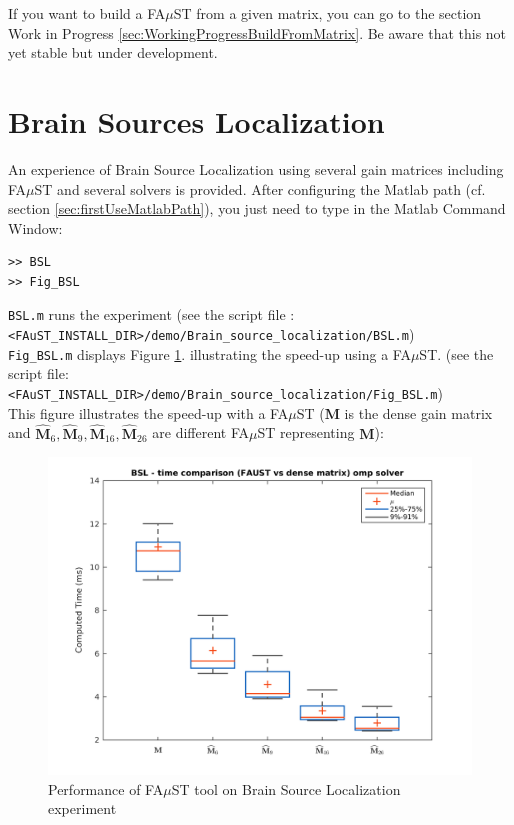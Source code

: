 If you want to build a FA$\mu$ST from a given matrix, you can go to the section Work in Progress \ref{sec:WorkingProgressBuildFromMatrix}.
Be aware that this not yet stable but under development.



\section{Brain Sources Localization}\label{sec:BSL_example}
%
An experience of Brain Source Localization using several gain matrices including FA$\mu$ST and several solvers is provided. After configuring the Matlab path (cf. section \ref{sec:firstUseMatlabPath}), you just need to type in the Matlab Command Window:

\lstset{style=customMatlab}
\begin{lstlisting}
>> BSL
>> Fig_BSL
\end{lstlisting}

\texttt{BSL.m} runs the experiment (see the script file :\\
\texttt{<FAuST\_INSTALL\_DIR>/demo/Brain\_source\_localization/BSL.m})\\
\texttt{Fig\_BSL.m} displays Figure \ref{fig:BSL}. illustrating the speed-up using a FA$\mu$ST. (see the script file:\\
\texttt{<FAuST\_INSTALL\_DIR>/demo/Brain\_source\_localization/Fig\_BSL.m}) \\

This figure illustrates the speed-up with a FA$\mu$ST ($\mathbf{M}$ is the dense gain matrix and $\widehat{\mathbf{M}}_{6},\widehat{\mathbf{M}}_{9},\widehat{\mathbf{M}}_{16},\widehat{\mathbf{M}}_{26}$ are different FA$\mu$ST representing  $\mathbf{M}$):


\begin{figure}[H] %
\centering
\includegraphics[scale=0.7]{images/BSL.png}
\caption{Performance of FA$\mu$ST tool on Brain Source Localization experiment}
\label{fig:BSL}
\end{figure}






 
